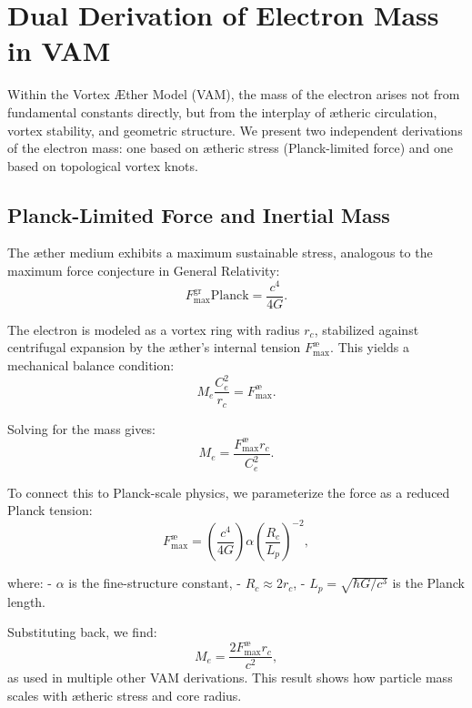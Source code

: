 \section{Dual Derivation of Electron Mass in VAM}
\label{appendix:mass-derivation}

Within the Vortex Æther Model (VAM), the mass of the electron arises not from fundamental constants directly, but from the interplay of ætheric circulation, vortex stability, and geometric structure. We present two independent derivations of the electron mass: one based on ætheric stress (Planck-limited force) and one based on topological vortex knots.

\subsection*{Planck-Limited Force and Inertial Mass}
\label{sec:mass-force-balance}

The æther medium exhibits a maximum sustainable stress, analogous to the maximum force conjecture in General Relativity:
\begin{equation*}
    F^{\text{gr}}_{\text{max}}{\text{Planck}} = \frac{c^4}{4G}.
\end{equation*}

The electron is modeled as a vortex ring with radius \( r_c \), stabilized against centrifugal expansion by the æther's internal tension \( F^{\text{\ae}}_{\text{max}} \). This yields a mechanical balance condition:
\begin{equation*}
    M_e \frac{C_e^2}{r_c} = F^{\text{\ae}}_{\text{max}}.
\end{equation*}

Solving for the mass gives:
\begin{equation*}
    M_e = \frac{F^{\text{\ae}}_{\text{max}} r_c}{C_e^2}.
\end{equation*}

To connect this to Planck-scale physics, we parameterize the force as a reduced Planck tension:
\begin{equation*}
    F^{\text{\ae}}_{\text{max}} = \left( \frac{c^4}{4G} \right) \alpha \left( \frac{R_c}{L_p} \right)^{-2},
\end{equation*}

where:
- \( \alpha \) is the fine-structure constant,
- \( R_c \approx 2 r_c \),
- \( L_p = \sqrt{\hbar G / c^3} \) is the Planck length.

Substituting back, we find:
\begin{equation}
    M_e = \frac{2 F^{\text{\ae}}_{\text{max}} r_c}{c^2},
\end{equation}
as used in multiple other VAM derivations. This result shows how particle mass scales with ætheric stress and core radius.

